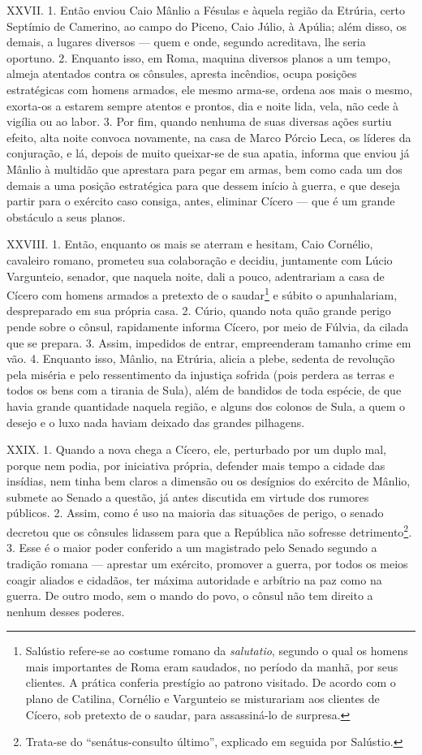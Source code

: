 XXVII. 1. Então enviou Caio Mânlio a Fésulas e àquela região da Etrúria, certo
Septímio de Camerino, ao campo do Piceno, Caio Júlio, à Apúlia; além disso, os
demais, a lugares diversos --- quem e onde, segundo acreditava, lhe seria
oportuno. 2. Enquanto isso, em Roma, maquina diversos planos a um tempo, almeja
atentados contra os cônsules, apresta incêndios, ocupa posições estratégicas
com homens armados, ele mesmo arma-se, ordena aos mais o mesmo, exorta-os a
estarem sempre atentos e prontos, dia e noite lida, vela, não cede à vigília ou
ao labor. 3. Por fim, quando nenhuma de suas diversas ações surtiu efeito, alta
noite convoca novamente, na casa de Marco Pórcio Leca, os líderes da
conjuração, e lá, depois de muito queixar-se de sua apatia, informa que enviou
já Mânlio à multidão que aprestara para pegar em armas, bem como cada um dos
demais a uma posição estratégica para que dessem início à guerra, e que deseja
partir para o exército caso consiga, antes, eliminar Cícero --- que  é um
grande obstáculo a seus planos.

XXVIII. 1. Então, enquanto os mais se aterram e hesitam, Caio Cornélio,
cavaleiro romano, prometeu sua colaboração e decidiu, juntamente com Lúcio
Vargunteio, senador, que naquela noite, dali a pouco, adentrariam a casa de
Cícero com homens armados a pretexto de o saudar\footnote{Salústio refere-se ao
costume romano da \emph{salutatio}, segundo o qual os homens mais importantes
de Roma eram saudados, no período da manhã, por seus clientes. A prática
conferia prestígio ao patrono visitado. De acordo com o plano de Catilina,
Cornélio e Vargunteio se misturariam aos clientes de Cícero, sob pretexto de o
saudar, para assassiná-lo de surpresa.} e súbito o apunhalariam, despreparado
em sua própria casa. 2. Cúrio, quando nota quão grande perigo pende sobre o
cônsul, rapidamente informa Cícero, por meio de Fúlvia, da cilada que se
prepara. 3. Assim, impedidos de entrar, empreenderam tamanho crime em vão. 4.
Enquanto isso, Mânlio, na Etrúria, alicia a plebe, sedenta de revolução pela
miséria e pelo ressentimento da injustiça sofrida (pois perdera as terras e
todos os bens com a tirania de Sula), além de bandidos de toda espécie, de que
havia grande quantidade naquela região, e alguns dos colonos de Sula, a quem o
desejo e o luxo nada haviam deixado das grandes pilhagens.

XXIX. 1. Quando a nova chega a Cícero, ele, perturbado por um duplo mal, porque
nem podia, por iniciativa própria, defender mais tempo a cidade das insídias,
nem tinha bem claros a dimensão ou os desígnios do exército de Mânlio, submete
ao Senado a questão, já antes discutida em virtude dos rumores públicos. 2.
Assim, como é uso na maioria das situações de perigo, o senado decretou que os
cônsules lidassem para que a República não sofresse
detrimento\footnote{Trata-se do 
``senátus-consulto último'', explicado em seguida por Salústio.}. 3. Esse é o
maior poder conferido a um magistrado pelo Senado segundo a tradição romana ---
aprestar um exército, promover a guerra, por todos os meios coagir aliados e
cidadãos, ter máxima autoridade e arbítrio na paz como na guerra. De outro
modo, sem o mando do povo, o cônsul não tem direito a nenhum desses poderes. 

